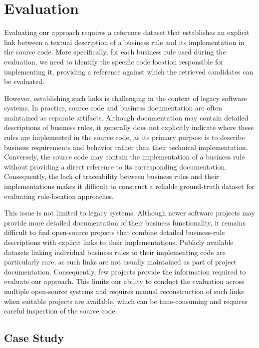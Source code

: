 \section{Evaluation}
\label{sec:evaluation}

Evaluating our approach requires a reference dataset that establishes an explicit link between a textual description of a business rule and its implementation in the source code. More specifically, for each business rule used during the evaluation, we need to identify the specific code location responsible for implementing it, providing a reference against which the retrieved candidates can be evaluated.

However, establishing such links is challenging in the context of legacy software systems. In practice, source code and business documentation are often maintained as separate artifacts. Although documentation may contain detailed descriptions of business rules, it generally does not explicitly indicate where these rules are implemented in the source code, as its primary purpose is to describe business requirements and behavior rather than their technical implementation. Conversely, the source code may contain the implementation of a business rule without providing a direct reference to its corresponding documentation. Consequently, the lack of traceability between business rules and their implementations makes it difficult to construct a reliable ground-truth dataset for evaluating rule-location approaches.

This issue is not limited to legacy systems. Although newer software projects may provide more detailed documentation of their business functionality, it remains difficult to find open-source projects that combine detailed business-rule descriptions with explicit links to their implementations. Publicly available datasets linking individual business rules to their implementing code are particularly rare, as such links are not usually maintained as part of project documentation. Consequently, few projects provide the information required to evaluate our approach. This limits our ability to conduct the evaluation across multiple open-source systems and requires manual reconstruction of such links when suitable projects are available, which can be time-consuming and requires careful inspection of the source code.

\subsection{Case Study}

